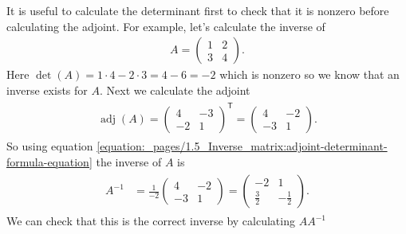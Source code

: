 \documentclass[letterpaper,10pt,english]{jupyterBook}
\begin{document}
\sphinxAtStartPar
It is useful to calculate the determinant first to check that it is non\sphinxhyphen{}zero before calculating the adjoint. For example, let’s calculate the inverse of
\begin{equation*}
\begin{split} A = \begin{pmatrix} 1 & 2 \\ 3 & 4 \end{pmatrix}. \end{split}
\end{equation*}
\sphinxAtStartPar
Here \(\det(A) = 1\cdot 4 - 2 \cdot3 = 4 - 6 = -2\) which is non\sphinxhyphen{}zero so we know that an inverse exists for \(A\). Next we calculate the adjoint
\begin{equation*}
\begin{split} \begin{align*}
    \operatorname{adj}(A) =
    \begin{pmatrix} 4 & -3 \\ -2 & 1 \end{pmatrix}^\mathsf{T}
    =
    \begin{pmatrix} 4 & -2 \\ -3 & 1 \end{pmatrix}.
\end{align*} \end{split}
\end{equation*}
\sphinxAtStartPar
So using equation \eqref{equation:_pages/1.5_Inverse_matrix:adjoint-determinant-formula-equation} the inverse of \(A\) is
\begin{equation*}
\begin{split} \begin{align*}
    A^{-1} &= \frac{1}{-2}\begin{pmatrix} 4 & -2 \\ -3 & 1 \end{pmatrix}
    = \begin{pmatrix} -2 & 1 \\ \frac{3}{2} & -\frac{1}{2} \end{pmatrix}.
\end{align*} \end{split}
\end{equation*}
\sphinxAtStartPar
We can check that this is the correct inverse by calculating \(AA^{-1}\)
\end{document}
